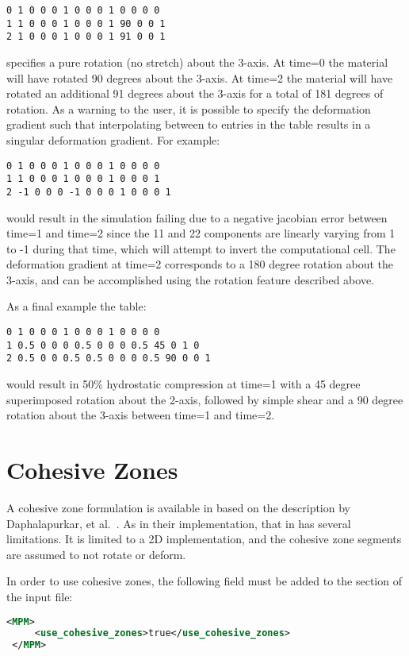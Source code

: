 \begin{lstlisting}[backgroundcolor=\color{background}]
0 1 0 0 0 1 0 0 0 1 0 0 0 0
1 1 0 0 0 1 0 0 0 1 90 0 0 1
2 1 0 0 0 1 0 0 0 1 91 0 0 1
\end{lstlisting}
specifies a pure rotation (no stretch) about the 3-axis.  At time=0 the material will have rotated 90 degrees about the 3-axis.  At time=2 the material will have rotated an additional 91 degrees about the 3-axis for a total of 181 degrees of rotation.  As a warning to the user, it is possible to specify the deformation gradient such that interpolating between to entries in the table results in a singular deformation gradient.  For example:
\begin{lstlisting}[backgroundcolor=\color{background}]
0 1 0 0 0 1 0 0 0 1 0 0 0 0
1 1 0 0 0 1 0 0 0 1 0 0 0 1
2 -1 0 0 0 -1 0 0 0 1 0 0 0 1
\end{lstlisting}
would result in the simulation failing due to a negative jacobian error between time=1 and time=2 since the 11 and 22 components are linearly varying from 1 to -1 during that time, which will attempt to invert the computational cell.  The deformation gradient at time=2 corresponds to a 180 degree rotation about the 3-axis, and can be accomplished using the rotation feature described above.

As a final example the table:
\begin{lstlisting}[backgroundcolor=\color{background}]
0 1 0 0 0 1 0 0 0 1 0 0 0 0
1 0.5 0 0 0 0.5 0 0 0 0.5 45 0 1 0
2 0.5 0 0 0.5 0.5 0 0 0 0.5 90 0 0 1
\end{lstlisting}
would result in 50\% hydrostatic compression at time=1 with a 45 degree superimposed rotation about the 2-axis, followed by  simple shear and a 90 degree rotation about the 3-axis between time=1 and time=2.

\section{Cohesive Zones} \label{Sec:CohesiveZones}
A cohesive zone formulation is available in \Vaango based on the description
by Daphalapurkar, et al.~\cite{Daphalapurkar}.  As in their implementation,
that in \Vaango has several limitations.  It is limited to a 2D implementation,
and the cohesive zone segments are assumed to not rotate or deform.

In order to use cohesive zones, the following field must be added to the
 section of the input file:

\begin{lstlisting}[language=XML]
 <MPM>
     <use_cohesive_zones>true</use_cohesive_zones>
 </MPM>
\end{lstlisting}

